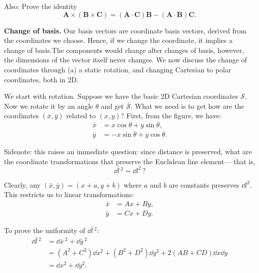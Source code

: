 \documentclass[10pt]{article}
\begin{document}
	Also: Prove the identity 
	\begin{equation}
	  \mathbf{A} \times (\mathbf{B} \times \mathbf{C}) = (\mathbf{A} \cdot \mathbf{C})\mathbf{B} - (\mathbf{A} \cdot \mathbf{B})\mathbf{C}.
	\end{equation}

	\vspace{1\baselineskip}
	\textbf{Change of basis.} Our basis vectors are coordinate basis vectors, derived from the coordinates we choose. Hence, if we change the coordinate, it implies a change of basis.The components would change after changes of basis, however, the dimensions of the vector itself never changes. We now discuss the change of coordinates through (a) a static rotation, and changing Cartesian to polar coordinates, both in 2D. 

	\vspace{1\baselineskip}
	We start with rotation. Suppose we have the basic 2D Cartesian coordinates $\mathcal{S}$. Now we rotate it by an angle $\theta$ and get $\bar{\mathcal{S}}$. What we need is to get how are the coordinates $(\bar{x},\bar{y})$ related to $(x,y)$? First, from the figure, we have:
	\begin{equation}
	  \begin{aligned}
	  \bar{x} &= x \cos \theta + y \sin \theta, \\
	  \bar{y} &= -x \sin \theta + y \cos \theta.
	  \end{aligned}
	\end{equation}

	Sidenote: this raises an immediate question: since distance is preserved, what are the coordinate transformations that preserve the Euclidean line element— that is,
	\begin{equation}
	  \dd \bar{l}\,^{2} = \dd l^{2}\,?
	\end{equation}

	Clearly, any $(\bar{x},\bar{y})=(x+a,y+b)$ where $a$ and $b$ are constants preserves $\dd l^{2}$. This restricts us to linear transformations:
	\begin{equation}
	  \begin{aligned}
	  \bar{x} &= Ax + By, \\
	  \bar{y} &= Cx + Dy.
	  \end{aligned}
	\end{equation}

	To prove the uniformity of $\dd \bar{l}\, ^{2}$:
	\begin{equation}
	  \begin{aligned}
	  \dd \bar{l} \,^{2} &= \dd \bar{x}\,^{2} + \dd \bar{y}\,^{2} \\
	  &= (A^{2}+C^{2})\dd x^{2} + (B^{2}+D^{2})\dd y^{2} + 2(AB+CD)\dd x \dd y \\
	  &= \dd x^{2} + \dd y^{2}.
	  \end{aligned}
	\end{equation}
\end{document}
